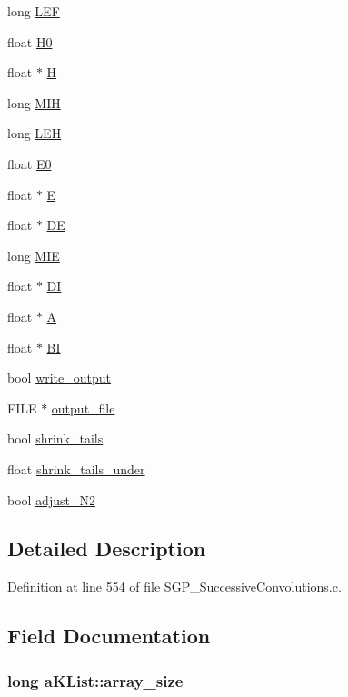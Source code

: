 \begin{CompactItemize}
\item 
long \hyperlink{structaKList_f92bb240bfdac1f2b3ada7dff4b27fbc}{LEF}
\item 
float \hyperlink{structaKList_dc0b1b5c7136426a4feb42f607f9cfeb}{H0}
\item 
float $\ast$ \hyperlink{structaKList_11cebe5c93f3b1cce63336144828896b}{H}
\item 
long \hyperlink{structaKList_8f19ff32d2995a7f54a9fbd164cdb29a}{MIH}
\item 
long \hyperlink{structaKList_dd2efa31b64b23ce2cf507e0197f8bbb}{LEH}
\item 
float \hyperlink{structaKList_5da44533db17bc1ecaf020e2741028e3}{E0}
\item 
float $\ast$ \hyperlink{structaKList_0fe402e9c4b1c9abc06508de5732dfde}{E}
\item 
float $\ast$ \hyperlink{structaKList_a37a11d7702cf2620b71f2d33cf96bc7}{DE}
\item 
long \hyperlink{structaKList_31da705df201058cb2789c63fd6be17a}{MIE}
\item 
float $\ast$ \hyperlink{structaKList_3e5e9b204bffe3e33b4d1304153ee61c}{DI}
\item 
float $\ast$ \hyperlink{structaKList_5fd3482239f3f60e99e6b2b0c746be88}{A}
\item 
float $\ast$ \hyperlink{structaKList_5ebd05f19ec8bb481bc6372166973552}{BI}
\item 
bool \hyperlink{structaKList_5c4591486a1c2979ee60d3b99644edee}{write\_\-output}
\item 
FILE $\ast$ \hyperlink{structaKList_7289c72fcd7a2467cb8373931dcc472c}{output\_\-file}
\item 
bool \hyperlink{structaKList_977b4034a6e9defc5825ba330d44dc9e}{shrink\_\-tails}
\item 
float \hyperlink{structaKList_62a6d997bd82869956bf9beb022716fc}{shrink\_\-tails\_\-under}
\item 
bool \hyperlink{structaKList_e399b9793e914c910828efdcb30ba8ec}{adjust\_\-N2}
\end{CompactItemize}


\subsection{Detailed Description}


Definition at line 554 of file SGP\_\-SuccessiveConvolutions.c.

\subsection{Field Documentation}
\hypertarget{structaKList_b20285368c240a1f4943c57b3e8105b1}{
\subsubsection[array\_\-size]{\setlength{\rightskip}{0pt plus 5cm}long {\bf aKList::array\_\-size}}}
\label{d8/d05/structaKList_b20285368c240a1f4943c57b3e8105b1}




